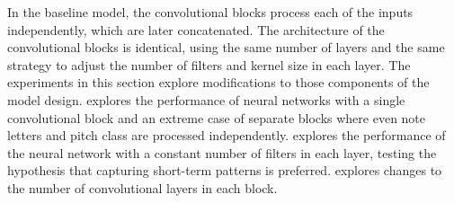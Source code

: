 
In the baseline model, the convolutional blocks process each
of the inputs independently, which are later concatenated.
The architecture of the convolutional blocks is identical,
using the same number of layers and the same strategy to
adjust the number of filters and kernel size in each layer.
The experiments in this section explore modifications to
those components of the model design.
 explores the
performance of neural networks with a single convolutional
block and an extreme case of separate blocks where even note
letters and pitch class are processed independently.
 explores the performance
of the neural network with a constant number of filters in
each layer, testing the hypothesis that capturing short-term
patterns is preferred.
 explores changes
to the number of convolutional layers in each block. 
